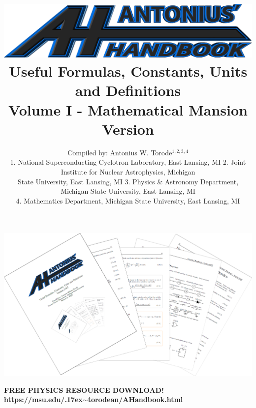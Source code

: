 \documentclass[openany,twoside, notitlepage,letterpaper,11pt]{book}
\title{\includegraphics[scale=.22]{./Images/Covers/AH2.png}
	\\ \vspace{1.5cm} Useful Formulas, Constants, Units and Definitions \\ Volume I - Mathematical Mansion \\ Version \Version}
\date{}
\author{Compiled by: Antonius W. Torode$^{1,2,3,4}$ \\ \scriptsize{1. National Superconducting Cyclotron Laboratory, East Lansing, MI 2. Joint Institute for Nuclear Astrophysics, Michigan} \\ \scriptsize{State University, East Lansing, MI 3. Physics \& Astronomy Department, Michigan State University, East Lansing, MI} \\ \scriptsize{4. Mathematics Department, Michigan State University, East Lansing, MI}}
\begin{document}
\frontmatter
\maketitle
\thispagestyle{empty}
\pagestyle{empty}
\begin{center}
	\includegraphics[scale=1.8]{./Images/Covers/background_tunnel.png}
	
{\Large \textbf{FREE PHYSICS RESOURCE DOWNLOAD!}\\ \textbf{https://msu.edu/{\raise.17ex\hbox{$\scriptstyle\sim$}}torodean/AHandbook.html} }
\end{center}
\end{document}
